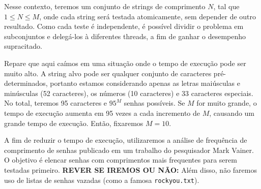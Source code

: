 \documentclass[12pt, a4paper]{article}
\begin{document}
Nesse contexto, teremos um conjunto de strings de comprimento $N$, tal que $1 \leq N \leq M$, onde cada string será testada atomicamente, sem depender de outro resultado. Como cada teste é independente, é possível dividir o problema em subconjuntos e delegá-los à diferentes threads, a fim de ganhar o desempenho supracitado.

Repare que aqui caímos em uma situação onde o tempo de execução pode ser muito alto. A string alvo pode ser qualquer conjunto de caracteres pré-determinados, portanto estamos considerando apenas as letras maiúsculas e minúsculas (52 caracteres), os números (10 caracteres) e 33 caracteres especiais. No total, teremos 95 caracteres e $95^{M}$ senhas possíveis. Se $M$ for muito grande, o tempo de execução aumenta em 95 vezes a cada incremento de $M$, causando um grande tempo de execução. Então, fixaremos $M=10$.

A fim de reduzir o tempo de execução, utilizaremos a análise de frequência de comprimento de senhas publicado em um trabalho do pesquisador Mark Vainer. O objetivo é elencar senhas com comprimentos mais frequentes para serem testadas primeiro. \textbf{REVER SE IREMOS OU NÃO: }Além disso, não faremos uso de listas de senhas vazadas (como a famosa \texttt{rockyou.txt}).
\end{document}

